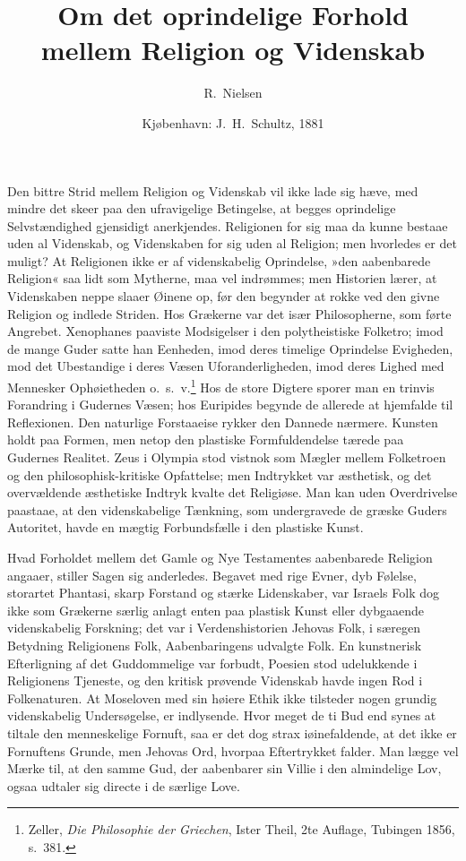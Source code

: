 \documentclass[12pt,a4paper]{article}
\title{\textbf{Om det oprindelige Forhold\\[4pt]
       mellem Religion og Videnskab}}
\author{R.\ Nielsen}
\date{Kjøbenhavn: J.\ H.\ Schultz, 1881}
\begin{document}
\maketitle
\thispagestyle{fancy}

\bigskip

\noindent Den bittre Strid mellem Religion og Videnskab vil ikke lade
sig hæve, med mindre det skeer paa den ufravigelige Betingelse,
at begges oprindelige Selvstændighed gjensidigt anerkjendes. Religionen
for sig maa da kunne bestaae uden al Videnskab, og Videnskaben for sig
uden al Religion; men hvorledes er det muligt? At Religionen ikke er
af videnskabelig Oprindelse, »den aabenbarede Religion« saa lidt som
Mytherne, maa vel indrømmes; men Historien lærer, at Videnskaben neppe
slaaer Øinene op, før den begynder at rokke ved den givne Religion og
indlede Striden. Hos Grækerne var det især Philosopherne, som førte
Angrebet. Xenophanes paaviste Modsigelser i den polytheistiske
Folketro; imod de mange Guder satte han Eenheden, imod deres timelige
Oprindelse Evigheden, mod det Ubestandige i deres Væsen
Uforanderligheden, imod deres Lighed med Mennesker Ophøietheden
o.\ s.\ v.\footnote{Zeller, \emph{Die Philosophie der Griechen}, Ister
Theil, 2te Auflage, Tubingen 1856, s.\ 381.} Hos de store Digtere
sporer man en trinvis Forandring i Gudernes Væsen; hos Euripides begynde
de allerede at hjemfalde til Reflexionen. Den naturlige Forstaaeise
rykker den Dannede nærmere. Kunsten holdt paa Formen, men netop den
plastiske Formfuldendelse tærede paa Gudernes Realitet. Zeus i Olympia
stod vistnok som Mægler mellem Folketroen og den philosophisk-kritiske
Opfattelse; men Indtrykket var æsthetisk, og det overvældende æsthetiske
Indtryk kvalte det Religiøse. Man kan uden Overdrivelse paastaae, at
den videnskabelige Tænkning, som undergravede de græske Guders
Autoritet, havde en mægtig Forbundsfælle i den plastiske Kunst.

Hvad Forholdet mellem det Gamle og Nye Testamentes aabenbarede Religion
angaaer, stiller Sagen sig anderledes. Begavet med rige Evner, dyb
Følelse, storartet Phantasi, skarp Forstand og stærke Lidenskaber, var
Israels Folk dog ikke som Grækerne særlig anlagt enten paa plastisk
Kunst eller dybgaaende videnskabelig Forskning; det var i
Verdenshistorien Jehovas Folk, i særegen Betydning Religionens Folk,
Aabenbaringens udvalgte Folk. En kunstnerisk Efterligning af det
Guddommelige var forbudt, Poesien stod udelukkende i Religionens
Tjeneste, og den kritisk prøvende Videnskab havde ingen Rod i
Folkenaturen. At Moseloven med sin høiere Ethik ikke tilsteder nogen
grundig videnskabelig Undersøgelse, er indlysende. Hvor meget de ti
Bud end synes at tiltale den menneskelige Fornuft, saa er det dog strax
iøinefaldende, at det ikke er Fornuftens Grunde, men Jehovas Ord,
hvorpaa Eftertrykket falder. Man lægge vel Mærke til, at den samme
Gud, der aabenbarer sin Villie i den almindelige Lov, ogsaa udtaler sig
directe i de særlige Love.
\end{document}
